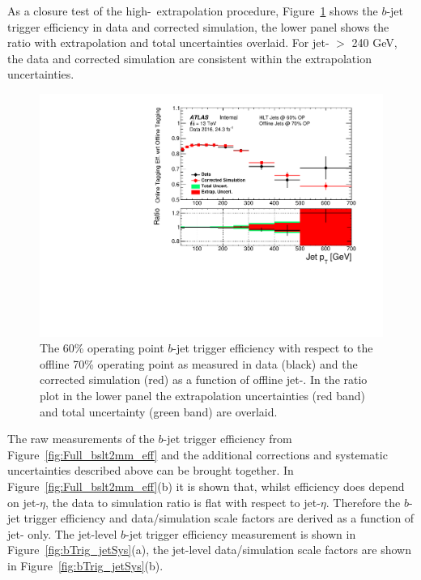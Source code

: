 As a closure test of the high-\pT~extrapolation procedure,
Figure~\ref{fig:bTrig_jetSys_effComp} shows the $b$-jet trigger efficiency in data and corrected simulation,
the lower panel shows the ratio with extrapolation and total uncertainties overlaid.
For jet-\pT{} $>$ 240 GeV, the data and corrected simulation are consistent within the extrapolation uncertainties.

\begin{figure}[!ht]
\begin{center}
    \includegraphics[width=0.5\linewidth, angle=0]{figs/Trigger/fullSys_EfficiencyComp_jetPt.pdf}
  \end{center}
\vspace{-1em}
\caption[The $b$-jet trigger efficiency measured in data and the corrected simulation as a function of offline jet-\pT.
  The extrapolation uncertainties and total uncertainty are shown.
    \label{fig:bTrig_jetSys_effComp}]
        {
    The 60\% operating point $b$-jet trigger efficiency with respect to the offline 70\% operating point
    as measured in data (black) and the corrected simulation (red) as a function of offline jet-\pT.
    In the ratio plot in the lower panel the extrapolation uncertainties (red band) and total uncertainty (green band) are overlaid.
    \label{fig:bTrig_jetSys_effComp}
  }
\end{figure}

\clearpage

The raw measurements of the $b$-jet trigger efficiency from Figure~\ref{fig:Full_bslt2mm_eff}
and the additional corrections and systematic uncertainties described above can be brought together.
In Figure~\ref{fig:Full_bslt2mm_eff}(b) it is shown that, whilst efficiency does depend on jet-$\eta$,
the data to simulation ratio is flat with respect to jet-$\eta$.
Therefore the $b$-jet trigger efficiency and data/simulation scale factors are derived as a function of jet-\pT{} only. 
The jet-level $b$-jet trigger efficiency measurement is shown in Figure~\ref{fig:bTrig_jetSys}(a),
the jet-level data/simulation scale factors are shown in Figure~\ref{fig:bTrig_jetSys}(b).


